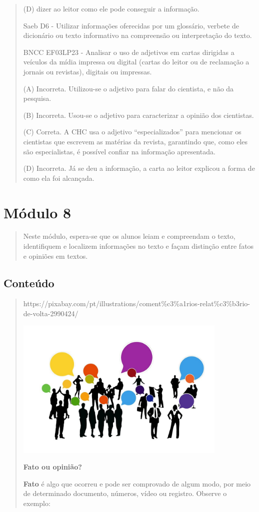 \begin{quote}
(D) dizer ao leitor como ele pode conseguir a informação.

Saeb D6 - Utilizar informações oferecidas por um glossário, verbete de
dicionário ou texto informativo na compreensão ou interpretação do
texto.

BNCC EF03LP23 - Analisar o uso de adjetivos em cartas dirigidas a
veículos da mídia impressa ou digital (cartas do leitor ou de reclamação
a jornais ou revistas), digitais ou impressas.

(A) Incorreta. Utilizou-se o adjetivo para falar do cientista, e não da
pesquisa.

(B) Incorreta. Usou-se o adjetivo para caracterizar a opinião dos
cientistas.

(C) Correta. A CHC usa o adjetivo ``especializados'' para mencionar os
cientistas que escrevem as matérias da revista, garantindo que, como
eles são especialistas, é possível confiar na informação apresentada.

(D) Incorreta. Já se deu a informação, a carta ao leitor explicou a
forma de como ela foi alcançada.
\end{quote}

\section{Módulo 8}\label{muxf3dulo-8}

\begin{quote}
Neste módulo, espera-se que os alunos leiam e compreendam o texto,
identifiquem e localizem informações no texto e façam distinção entre
fatos e opiniões em textos.
\end{quote}

\subsection{Conteúdo}\label{conteuxfado-7}

\begin{quote}
https://pixabay.com/pt/illustrations/coment\%c3\%a1rios-relat\%c3\%b3rio-de-volta-2990424/

\includegraphics[width=3.98294in,height=2.65514in]{media/image24.jpeg}

\textbf{Fato ou opinião?}

\textbf{Fato} é algo que ocorreu e pode ser comprovado de algum modo,
por meio de determinado documento, números, vídeo ou registro. Observe o
exemplo:
\end{quote}

